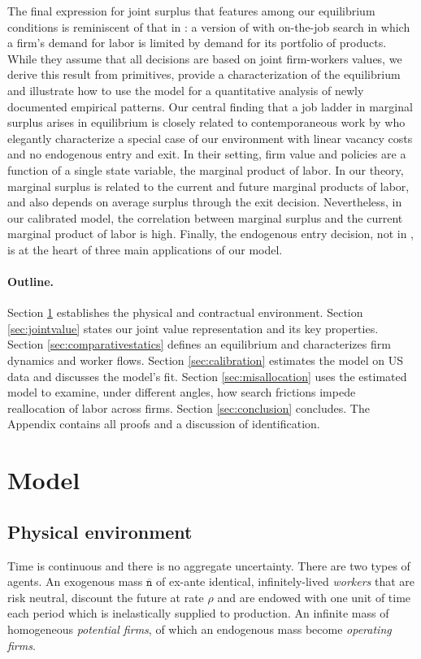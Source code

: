 The final expression for joint surplus that features among our equilibrium conditions is reminiscent of that in \citet{LentzMortensenWP}: a version of \citet{klettekortum2004} with on-the-job search in which a firm's demand for labor is limited by demand for its portfolio of products.
While they {assume} that all decisions are based on joint firm-workers values, we derive this result from primitives, provide a characterization of the equilibrium and illustrate how to use the model for a quantitative analysis of newly documented empirical patterns.
Our central finding that a job ladder in marginal surplus arises in equilibrium is closely related to contemporaneous work by \citet{elsbygottfries2021} who elegantly characterize a special case of our environment with linear vacancy costs and no endogenous entry and exit. In their setting, firm value and policies are a function of a single state variable, the marginal product of labor. In our theory, marginal surplus is related to the current and future marginal products of labor, and also depends on average surplus through the exit decision. Nevertheless, in our calibrated model, the correlation between marginal surplus and the current marginal product of labor is high. Finally, the endogenous entry decision, not in \citet{elsbygottfries2021}, is at the heart of three main applications of our model.

\paragraph{Outline.}
Section \ref{sec:environment} establishes the physical and contractual environment.
Section \ref{sec:jointvalue} states our joint value representation and its key properties.
Section \ref{sec:comparativestatics} defines an equilibrium and characterizes firm dynamics and worker flows.
Section \ref{sec:calibration} estimates the model on US data and discusses the model's fit.
Section \ref{sec:misallocation} uses the estimated model to examine, under different angles, how search frictions impede reallocation of labor across firms.
Section \ref{sec:conclusion} concludes. The Appendix contains all proofs and a discussion of identification.


\section{Model}\label{sec:environment}

\subsection{Physical environment}
Time is continuous and there is no aggregate uncertainty.
There are two types of agents.
An exogenous mass $\mathtt{\overline{n}}$ of ex-ante identical, infinitely-lived \emph{workers} that are risk neutral, discount the future at rate $\rho$ and are endowed with one unit of time each period which is inelastically supplied to production.
An infinite mass of homogeneous \emph{potential firms}, of which an endogenous mass become \emph{operating firms}.

